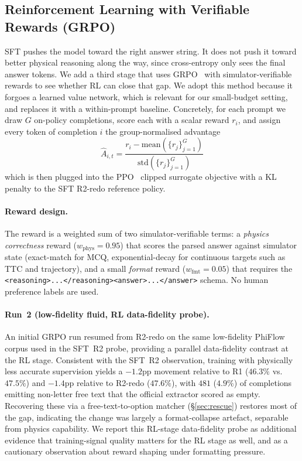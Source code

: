 \documentclass{article}
\begin{document}
\subsection{Reinforcement Learning with Verifiable Rewards (GRPO)}
\label{sec:grpo}

SFT pushes the model toward the right answer string. It does not push
it toward better physical reasoning along the way, since cross-entropy
only sees the final answer tokens. We add a third stage that uses
GRPO~\cite{deepseekmath2024} with simulator-verifiable rewards to see
whether RL can close that gap.
We adopt this method because it forgoes a learned value network, which
is relevant for our small-budget setting, and replaces it with a
within-prompt baseline. Concretely, for each prompt we draw $G$
on-policy completions, score each with a scalar reward $r_i$, and
assign every token of completion $i$ the group-normalised advantage
\[
\hat{A}_{i,t} = \frac{r_i - \mathrm{mean}(\{r_j\}_{j=1}^{G})}
                     {\mathrm{std}(\{r_j\}_{j=1}^{G})}
\]
which is then plugged into the PPO~\cite{ppo2017} clipped surrogate
objective with a KL penalty to the SFT R2-redo reference policy.

\paragraph{Reward design.} The reward is a weighted sum of two
simulator-verifiable terms: a \emph{physics correctness} reward
($w_{\text{phys}}{=}0.95$) that scores the parsed answer against
simulator state (exact-match for MCQ, exponential-decay for
continuous targets such as TTC and trajectory), and a small
\emph{format} reward ($w_{\text{fmt}}{=}0.05$) that requires the
\texttt{<reasoning>...</reasoning><answer>...</answer>} schema. No
human preference labels are used.

\paragraph{Run~2 (low-fidelity fluid, RL data-fidelity probe).} An
initial GRPO run resumed from R2-redo on the same low-fidelity PhiFlow
corpus used in the SFT~R2 probe, providing a parallel data-fidelity
contrast at the RL stage. Consistent with the SFT~R2 observation,
training with physically less accurate supervision yields a $-1.2$pp
movement relative to R1 ($46.3\%$ vs.\ $47.5\%$) and $-1.4$pp relative
to R2-redo ($47.6\%$), with $481$ ($4.9\%$) of completions emitting
non-letter free text that the official extractor scored as empty.
Recovering these via a free-text-to-option matcher (\S\ref{sec:rescue})
restores most of the gap, indicating the change was largely a
format-collapse artefact, separable from physics capability. We
report this RL-stage data-fidelity probe as additional evidence that
training-signal quality matters for the RL stage as well, and as a
cautionary observation about reward shaping under formatting pressure.
\end{document}
